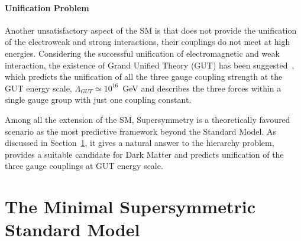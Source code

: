 \paragraph{Unification Problem}	Another unsatisfactory aspect of the SM is that does not provide the unification of the electroweak and strong interactions,
	their couplings do not meet at high energies. Considering the successful unification of electromagnetic and weak
	interaction, the existence of Grand Unified Theory (GUT) has been 
	suggested~\cite{GUT1,GUT2}, which predicts the unification of all the three gauge coupling strength at the GUT energy scale,
	$\Lambda_{GUT} \simeq 10^{16}$~GeV and describes the three forces within a single gauge group with just one coupling constant.

\vspace{0.5cm}
Among all the extension of the SM, Supersymmetry is a theoretically favoured scenario as the most predictive framework beyond the Standard Model.
As discussed in Section~\ref{sec:MSSM}, it gives a natural answer to the hierarchy problem, provides a suitable candidate for Dark Matter
and predicts unification of the three gauge couplings at GUT energy scale.


%
%

 
\section{The Minimal Supersymmetric Standard Model}\label{sec:MSSM}
